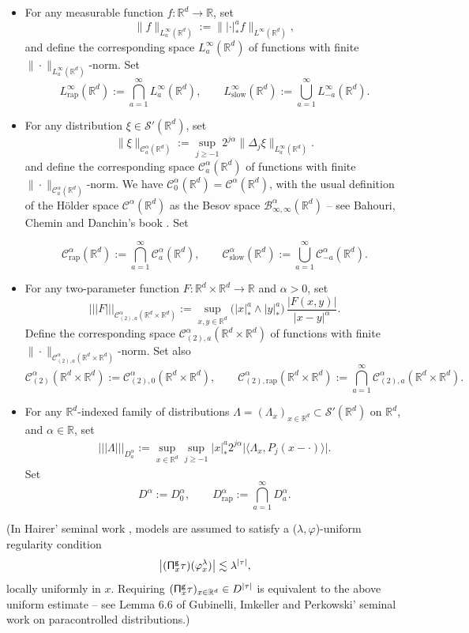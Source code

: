 \documentclass[JEP,XML,SOM,Unicode,published]{cedram}
\theoremstyle{plain}
\theoremstyle{definition}
\newcommand{\trino}[1]{|\!|\!|#1|\!|\!|}
\newcommand{\rap}{\mathrm{rap}}
\newcommand{\slow}{\mathrm{slow}}
\newcommand{\sfg}{\mathsf{g}}
\newcommand{\bbR}{\mathbb{R}}
\newcommand{\mcB}{\mathcal{B}}
\newcommand{\mcC}{\mathcal{C}}
\newcommand\mcS{\mathcal{S}}
\begin{document}
\begin{itemize}
	\item For any measurable function $f:\bbR^d\to\bbR$, set
\[
\|f\|_{L_a^\infty(\bbR^d)} := \big\||{\cdot}|_*^a f\big\|_{L^\infty(\bbR^d)},
\]
and define the corresponding space $L_a^\infty(\bbR^d)$ of functions with finite $\|{\cdot}\|_{L_a^\infty(\bbR^d)}$-norm. Set
\[
L_{\rap}^\infty(\bbR^d) := \bigcap_{a=1}^\infty L_a^\infty(\bbR^d), \qquad L_{\slow}^\infty(\bbR^d) := \bigcup_{a=1}^\infty L_{-a}^\infty(\bbR^d).
\]

	\item For any distribution $\xi\in\mcS'(\bbR^d)$, set
\[
\|\xi\|_{\mcC_a^\alpha(\bbR^d)} := \sup_{j\ge-1}2^{j\alpha}\|\Delta_j\xi\|_{L_a^\infty(\bbR^d)}.
\]
and define the corresponding space $\mcC_a^\alpha(\bbR^d)$ of functions with finite $\|{\cdot}\|_{\mcC_a^\alpha(\bbR^d)}$-norm. We have $\mcC^\alpha_0(\bbR^d) = \mcC^\alpha(\bbR^d)$, with the usual definition of the Hölder space $\mcC^\alpha(\bbR^d)$ as the Besov space $\mcB^\alpha_{\infty,\infty}(\bbR^d)$ -- see \eg Bahouri, Chemin and Danchin's book \cite{BCD11}. Set

\[
\mcC_\rap^\alpha(\bbR^d) := \bigcap_{a=1}^\infty \mcC_a^\alpha(\bbR^d), \qquad \mcC_\slow^\alpha(\bbR^d) := \bigcup_{a=1}^\infty \mcC_{-a}^\alpha(\bbR^d).
\]

	\item For any two-parameter function $F:\bbR^d\times\bbR^d\to\bbR$ and $\alpha>0$, set
\[
\trino{F}_{\mcC_{(2),a}^\alpha(\bbR^d\times\bbR^d)} := \sup_{x,y\in\bbR^d}\bigl(|x|_*^a\wedge|y|_*^a\bigr)\,\frac{\big|F(x,y)\big|}{|x-y|^\alpha}.
\]
Define the corresponding space $\mcC_{(2),a}^\alpha(\bbR^d\times\bbR^d)$ of functions with finite $\|{\cdot}\|_{\mcC_{(2),a}^\alpha(\bbR^d\times\bbR^d)}$-norm. Set also
\[
\mcC_{(2)}^\alpha(\bbR^d\times\bbR^d) := \mcC_{(2),0}^\alpha(\bbR^d\times\bbR^d), \qquad \mcC^\alpha_{(2),\rap}(\bbR^d\times\bbR^d) := \bigcap_{a=1}^\infty \mcC^\alpha_{(2),a}(\bbR^d\times\bbR^d).
\]

	\item For any $\bbR^d$-indexed family of distributions $\Lambda=(\Lambda_x)_{x\in\bbR^d}\subset\mcS'(\bbR^d)$ on $\bbR^d$, and $\alpha\in\bbR$, set
\begin{align*}
\trino{\Lambda}_{D_a^\alpha}:=\sup_{x\in\bbR^d}\sup_{j\ge-1}|x|_*^a2^{j\alpha}\big| \langle\Lambda_x, P_j(x-\cdot)\rangle\big|.
\end{align*}
Set\vspace*{-3pt}
\[
D^\alpha:=D_0^\alpha, \qquad D_\rap^\alpha := \bigcap_{a=1}^\infty D^\alpha_a.
\]
\end{itemize}
(In Hairer' seminal work \cite{Hai}, models are assumed to satisfy a ($\lambda, \varphi$)-uniform regularity condition\vspace*{-3pt}
\[
\big|({\sf \Pi}^{\sfg}_x\tau)(\varphi_x^\lambda)\big|\lesssim\lambda^{|\tau|},
\]
locally uniformly in $x$. Requiring $({\sf \Pi}^{\sfg}_x\tau)_{x\in\bbR^d}\in D^{|\tau|}$ is equivalent to the above uniform estimate -- see \eg Lemma 6.6 of Gubinelli, Imkeller and Perkowski' seminal work \cite{GIP} on paracontrolled distributions.)
\end{document}
